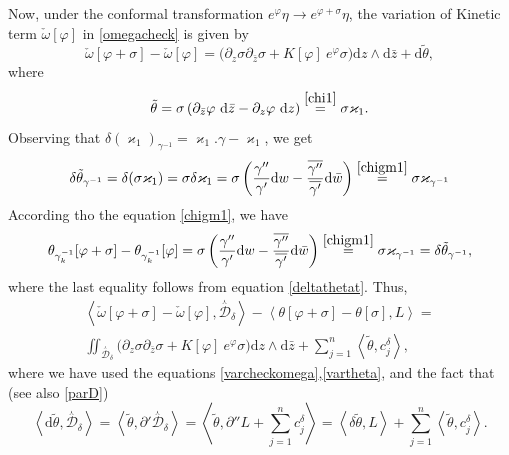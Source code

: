 \documentclass[a4paper,11pt]{article}
\newcommand{\dd}{\mathrm{d}}
\newcommand{\singfund}{\overset{{}_{\curlywedge}}{\mathcal{D}}}
\newcommand{\stks}[1]{
	 \left< #1 \right>
}
\begin{document}
Now, under the conformal transformation $e^{\varphi}\eta \rightarrow e^{\varphi+\sigma}\eta$, the variation of Kinetic term $\check\omega[\varphi]$ in \eqref{omegacheck} is given by
\begin{equation}\label{varcheckomega}
\check\omega[\varphi +\sigma]  -\check\omega[\varphi] = \Big(\partial_z\sigma\partial_{\bar{z}} \sigma +  K[\varphi] ~e^{\varphi} \sigma\Big) \dd z\wedge \dd \bar{z} +\dd \tilde{\theta},
\end{equation}
where 
\begin{equation}\label{thetat}
\tilde{\theta} = \sigma \left(\partial_{\bar{z}}\varphi ~\dd \bar{z}-\partial_{z}\varphi~ \dd z\right) \overset{\eqref{chi1}}{=}\sigma \varkappa_{1}.
\end{equation}
Observing that $\delta(\varkappa_{1})_{\gamma^{-1}} = \varkappa_{1}.\gamma-\varkappa_1$, we get
\begin{equation}\label{deltathetat}
\delta\tilde{\theta}_{\gamma^{-1}} = \delta (\sigma \varkappa_{1}) =\sigma \delta\varkappa_{1}= \sigma \left(\frac{\gamma^{\prime\prime}}{\gamma^{\prime}} \dd w -\frac{\overline{\gamma^{\prime\prime}}}{\overline{\gamma^{\prime}}} \dd\bar{w}\right) \overset{\eqref{chigm1}}{=} \sigma \varkappa_{\gamma^{-1}} 
\end{equation}
According tho the equation \eqref{chigm1}, we have
\begin{equation}\label{vartheta}
\theta_{\gamma_k^{-1}}[\varphi+\sigma]-\theta_{\gamma_k^{-1}}[\varphi] = \sigma \left(\frac{\gamma^{\prime\prime}}{\gamma^{\prime}} \dd w -\frac{\overline{\gamma^{\prime\prime}}}{\overline{\gamma^{\prime}}} \dd\bar{w}\right) \overset{\eqref{chigm1}}{=} \sigma \varkappa_{\gamma^{-1}} = \delta\tilde{\theta}_{\gamma^{-1}},
\end{equation}
where the last equality follows from equation \eqref{deltathetat}. Thus,
\begin{multline}
\stks{\check{\omega}[\varphi+\sigma]-\check{\omega}[\varphi],\singfund_{\delta}}-\stks{\theta[\varphi+\sigma]-\theta[\sigma],L} = \\ \iint_{\singfund_{\delta}}\Big(\partial_z \sigma\partial_{\bar{z}}\sigma +  K[\varphi] ~e^{\varphi} \sigma\Big) \dd z\wedge \dd \bar{z} +\sum_{j=1}^{n}\stks{\tilde{\theta}, c_{j}^{\delta}},\label{q3}
\end{multline}
where we have used the equations \eqref{varcheckomega},\eqref{vartheta}, and the fact that (see also \eqref{parD})
\begin{equation}
\stks{\dd \tilde\theta,\singfund_{\delta}} =\stks{\tilde\theta,\partial' \singfund_{\delta}} = \stks{\tilde\theta, \partial'' L+ \sum_{j=1}^{n}c_{j}^{\delta}} = \stks{\delta\tilde\theta,L}+\sum_{j=1}^{n}\stks{\tilde\theta,c_{j}^{\delta}}.
\end{equation}
\end{document}
